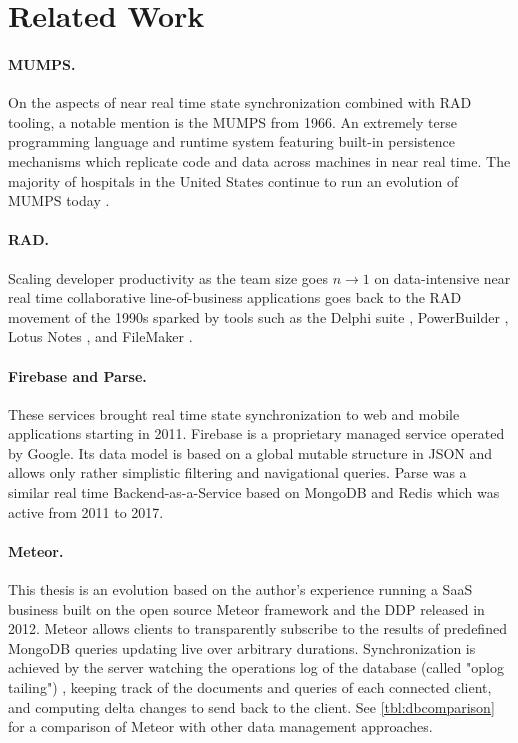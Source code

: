 \cleardoublepage
\section{Related Work}\label{sec:related_work}


\paragraph{MUMPS.} On the aspects of near real time state synchronization combined with RAD tooling, a notable mention is the \gls{MUMPS} \cite{bowie1979methods} from 1966. An extremely terse programming language and runtime system featuring built-in persistence mechanisms which replicate code and data across machines in near real time. The majority of hospitals in the United States continue to run an evolution of MUMPS today \cite{aller2018evolution}.

\paragraph{RAD.} Scaling developer productivity as the team size goes $n \to 1$ on data-intensive near real time collaborative line-of-business applications goes back to the \gls{RAD} movement of the 1990s sparked by tools such as the Delphi suite \cite{mackay2000reconfiguring}, PowerBuilder \cite{zubeck1997implementing}, Lotus Notes \cite{zubeck1997implementing}, and FileMaker
\cite{chen2010developing}.

\paragraph{Firebase and Parse.} These services brought real time state synchronization to web and mobile applications starting in 2011. Firebase is a proprietary managed service operated by Google. Its data model is based on a global mutable structure in \gls{JSON} and allows only rather simplistic filtering and navigational queries. Parse was a similar real time Backend-as-a-Service based on MongoDB and Redis which was active from 2011 to 2017. \cite{wingerath2019real}

\paragraph{Meteor.} This thesis is an evolution based on the author's experience running a \gls{SaaS} business built on the open source Meteor \cite{schmidt2014live} framework and the \gls{DDP} \cite{ddpspec} released in 2012. Meteor allows clients to transparently subscribe to the results of predefined MongoDB queries updating live over arbitrary durations. Synchronization is achieved by the server watching the operations log of the database (called "oplog tailing") \cite{wingerath2019real}, keeping track of the documents and queries of each connected client, and computing delta changes to send back to the client. See \autoref{tbl:dbcomparison} for a comparison of Meteor with other data management approaches.

